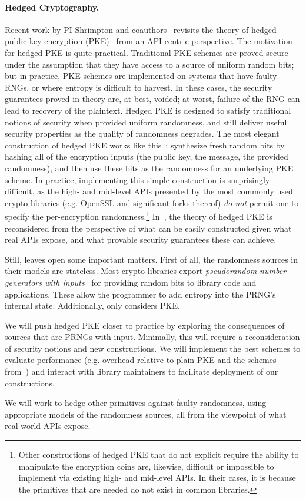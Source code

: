 \paragraph{Hedged Cryptography. }
Recent work by PI Shrimpton and coauthors~\cite{BPS} revisits the theory of
hedged public-key encryption (PKE)~\cite{BBN+} from an API-centric perspective.
%
The motivation for hedged PKE is quite practical. Traditional PKE schemes are
proved secure under the assumption that they have access to a source of uniform
random bits; but in practice, PKE schemes are implemented on systems that have
faulty RNGs, or where entropy is difficult to harvest.  In these cases, the
security guarantees proved in theory are, at best, voided; at worst, failure of
the RNG can lead to recovery of the plaintext.
%
Hedged PKE is designed to satisfy traditional notions of security when provided
uniform randomness, and still deliver useful security properties as the quality
of randomness degrades.  The most elegant construction of hedged PKE works like
this~\cite{BBN+,BH15}: synthesize fresh random bits by hashing all of the
encryption inputs (the public key, the message, the provided randomness), and
then use these bits as the randomness for an underlying PKE scheme.  In
practice, implementing this simple construction is surprisingly difficult, as
the high- and mid-level APIs presented by the most commonly used crypto
libraries (e.g. OpenSSL and significant forks thereof) \emph{do not} permit one
to specify the per-encryption randomness.\footnote{Other constructions of hedged
PKE that do not explicit require the ability to manipulate the encryption coins
are, likewise, difficult or impossible to implement via existing high- and
mid-level APIs.  In their cases, it is because the primitives that are needed do
not exist in common libraries.}
In~\cite{BPS}, the theory of hedged
PKE is reconsidered from the perspective of what can be easily constructed given
what real APIs expose, and what provable security guarantees these can
achieve.

Still, \cite{BPS} leaves open some important matters.  First of all, the
randomness sources in their models are stateless.  Most crypto libraries export
\emph{pseudorandom number generators with inputs}~\cite{BH05,DPR+13,ST15} for
providing random bits to library code and applications. These allow the
programmer to add entropy into the PRNG's internal state.  Additionally,
\cite{BPS} only considers PKE.


\begin{task}
We will push hedged PKE closer to practice by exploring the
consequences of sources that are PRNGs with input.  Minimally, this will require
a reconsideration of security notions and new constructions.  We will
implement the best schemes to evaluate performance (e.g. overhead
relative to plain PKE and the schemes from~\cite{BPS}) and interact
with library maintainers to facilitate deployment of our constructions.
\end{task}

\begin{task}
We will work to hedge other primitives against faulty randomness,
using appropriate models of the randomness sources, all from the
viewpoint of what real-world APIs expose.
\end{task}
